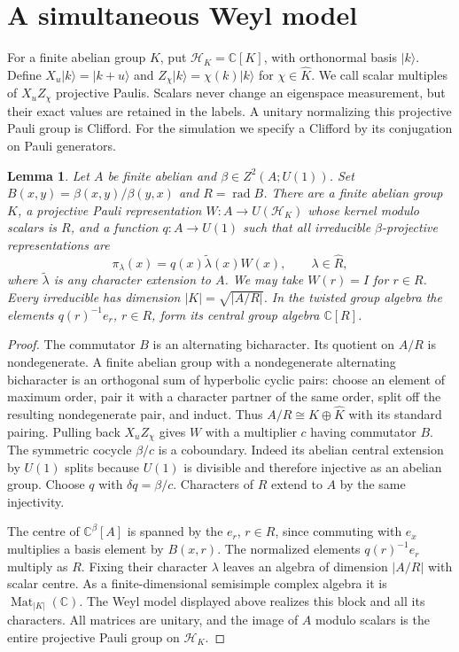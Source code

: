 \documentclass[11pt]{amsart}
\newtheorem{lemma}[theorem]{Lemma}
\theoremstyle{definition}\newtheorem{definition}[theorem]{Definition}
\newcommand{\C}{\mathbb C}
\newcommand{\rad}{\operatorname{rad}}
\begin{document}
\section{A simultaneous Weyl model}
For a finite abelian group $K$, put $\mathcal H_K=\C[K]$, with orthonormal
basis $|k\rangle$. Define $X_u|k\rangle=|k+u\rangle$ and
$Z_\chi|k\rangle=\chi(k)|k\rangle$ for $\chi\in\widehat K$.
We call scalar multiples of $X_uZ_\chi$ projective Paulis. Scalars never change
an eigenspace measurement, but their exact values are retained in the labels.
A unitary normalizing this projective Pauli group is Clifford. For the
simulation we specify a Clifford by its conjugation on Pauli generators.

\begin{lemma}\label{lem:heis}
Let $A$ be finite abelian and $\beta\in Z^2(A;U(1))$. Set
$B(x,y)=\beta(x,y)/\beta(y,x)$ and $R=\rad B$.
There are a finite abelian group $K$, a projective Pauli representation
$W:A\to U(\mathcal H_K)$ whose kernel modulo scalars is $R$, and a function
$q:A\to U(1)$ such that all irreducible $\beta$-projective representations are
\[
 \pi_\lambda(x)=q(x)\widetilde\lambda(x)W(x),\qquad
 \lambda\in\widehat R,
\]
where $\widetilde\lambda$ is any character extension to $A$.
We may take $W(r)=I$ for $r\in R$. Every irreducible has dimension
$|K|=\sqrt{|A/R|}$. In the twisted group algebra the elements
$q(r)^{-1}e_r$, $r\in R$, form its central group algebra $\C[R]$.
\end{lemma}
\begin{proof}
The commutator $B$ is an alternating bicharacter. Its quotient on $A/R$ is
nondegenerate. A finite abelian group with a nondegenerate alternating
bicharacter is an orthogonal sum of hyperbolic cyclic pairs: choose an element
of maximum order, pair it with a character partner of the same order, split
off the resulting nondegenerate pair, and induct. Thus
$A/R\cong K\oplus\widehat K$ with its standard pairing.
Pulling back $X_uZ_\chi$ gives $W$ with a multiplier $c$ having commutator $B$.
The symmetric cocycle $\beta/c$ is a coboundary. Indeed its abelian central
extension by $U(1)$ splits because $U(1)$ is divisible and therefore injective
as an abelian group. Choose $q$ with $\delta q=\beta/c$.
Characters of $R$ extend to $A$ by the same injectivity.

The centre of $\C^\beta[A]$ is spanned by the $e_r$, $r\in R$, since commuting
with $e_x$ multiplies a basis element by $B(x,r)$. The normalized elements
$q(r)^{-1}e_r$ multiply as $R$. Fixing their character $\lambda$ leaves an
algebra of dimension $|A/R|$ with scalar centre. As a finite-dimensional
semisimple complex algebra it is $\operatorname{Mat}_{|K|}(\C)$.
The Weyl model displayed above realizes this block and all its characters.
All matrices are unitary, and the image of $A$ modulo scalars is the entire
projective Pauli group on $\mathcal H_K$.
\end{proof}
\end{document}
